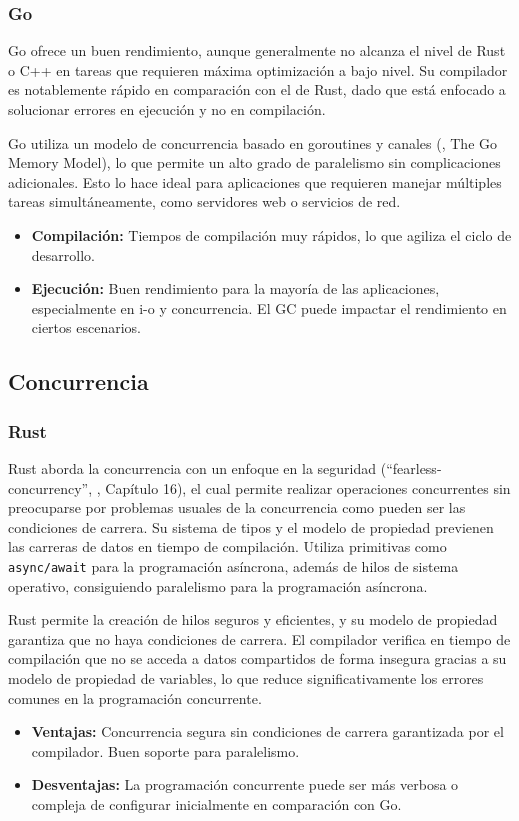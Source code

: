 \subsubsection{Go}

Go ofrece un buen rendimiento, aunque generalmente no alcanza el nivel de Rust o C++ en tareas que requieren máxima optimización a bajo nivel. Su compilador es notablemente rápido en comparación con el de Rust, dado que está enfocado a solucionar errores en ejecución y no en compilación.

Go utiliza un modelo de concurrencia basado en \glspl{goroutine} y canales (\cite{go-documentation}, The Go Memory Model), lo que permite un alto grado de paralelismo sin complicaciones adicionales. Esto lo hace ideal para aplicaciones que requieren manejar múltiples tareas simultáneamente, como servidores web o servicios de red.

\begin{itemize}
    \item \textbf{Compilación:} Tiempos de compilación muy rápidos, lo que agiliza el ciclo de desarrollo.
    \item \textbf{Ejecución:} Buen rendimiento para la mayoría de las aplicaciones, especialmente en \acrshort{i-o} y concurrencia. El GC puede impactar el rendimiento en ciertos escenarios.
\end{itemize}

\subsection{Concurrencia}
\subsubsection{Rust}

Rust aborda la concurrencia con un enfoque en la seguridad (``\gls{fearless-concurrency}'', \cite{rustbook2024}, Capítulo 16), el cual permite realizar operaciones concurrentes sin preocuparse por problemas usuales de la concurrencia como pueden ser las condiciones de carrera.
Su sistema de tipos y el modelo de propiedad previenen las carreras de datos en tiempo de compilación.
Utiliza primitivas como \texttt{async/await} para la programación asíncrona, además de hilos de sistema operativo, consiguiendo paralelismo para la programación asíncrona.

Rust permite la creación de hilos seguros y eficientes, y su modelo de propiedad garantiza que no haya condiciones de carrera. El compilador verifica en tiempo de compilación que no se acceda a datos compartidos de forma insegura gracias a su modelo de propiedad de variables, lo que reduce significativamente los errores comunes en la programación concurrente.
\begin{itemize}
    \item \textbf{Ventajas:} Concurrencia segura sin condiciones de carrera garantizada por el compilador. Buen soporte para paralelismo.
    \item \textbf{Desventajas:} La programación concurrente puede ser más verbosa o compleja de configurar inicialmente en comparación con Go.
\end{itemize}

